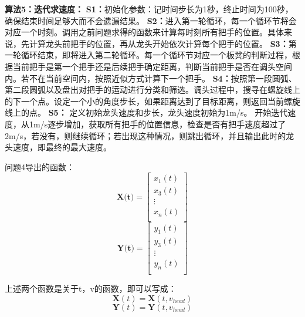 \documentclass{cumcmthesis1}
\begin{document}
\par
\textbf{算法5：迭代求速度：}
\newline
\noindent
\textbf{S1：}初始化参数：记时间步长为1秒，终止时间为100秒，确保结束时间足够大而不会遗漏结果。
\noindent
\newline
\textbf{S2：}进入第一轮循环，每一个循环节将会对应一个时刻。调用之前问题求得的函数来计算每时刻所有把手的位置。具体来说，先计算龙头前把手的位置，再从龙头开始依次计算每个把手的位置。
\newline
\noindent
\textbf{S3：}第一轮循环结束，即将进入第二轮循环。每一个循环节对应一个板凳的判断过程，根据当前把手是第一个把手还是后续把手确定距离，判断当前把手是否在调头空间内。若不在当前空间内，按照近似方式计算下一个把手。
\newline
\noindent
\textbf{S4：}按照第一段圆弧、第二段圆弧以及盘出对把手的运动进行分类和筛选。调头过程中，搜寻在螺旋线上的下一个点。设定一个小的角度步长，如果距离达到了目标距离，则返回当前螺旋线上的点。
\newline
\noindent
\textbf{S5：} 定义初始龙头速度和步长，龙头速度初始为1m/s。 开始迭代速度，从1m/s逐步增加，获取所有把手的位置信息，检查是否有把手速度超过了2m/s，若没有，则继续循环；若出现这种情况，则跳出循环，并且输出此时的龙头速度，即最终的最大速度。
\par
问题4导出的函数：
\begin{equation}
    \textbf{X(t)}=
    \begin{bmatrix}
    x_1(t)\\
    x_3(t)\\
    \vdots\\
    x_n(t)\\
    \end{bmatrix}
\end{equation}
\begin{equation}
    \textbf{Y(t)}=
    \begin{bmatrix}
    y_1(t)\\
    y_3(t)\\
    \vdots\\
    y_n(t)\\
    \end{bmatrix}
\end{equation}
\par
上述两个函数是关于t，v的函数，即可以写成：
\begin{equation}
    \textbf{X}(t)= \textbf{X}(t,v_{head})
\end{equation}
\begin{equation}
    \textbf{Y}(t) = \textbf{Y}(t,v_{head})
\end{equation}
\end{document}
